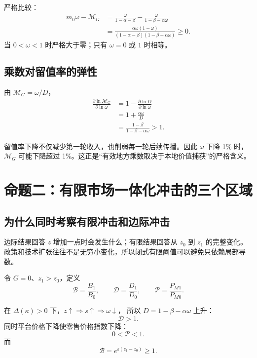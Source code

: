 \documentclass[UTF8,11pt,scheme=chinese,fontset=fandol]{ctexart}
\newcommand{\calB}{\mathcal B}
\newcommand{\calD}{\mathcal D}
\newcommand{\calP}{\mathcal P}
\newcommand{\MG}{\mathcal M_G}
\theoremstyle{definition}
\begin{document}
严格比较：
\begin{align}
m_0\omega-\MG
&=\frac{\omega}{1-\alpha-\beta}
-\frac{\omega}{1-\beta-\alpha\omega}\\
&=\frac{\alpha\omega(1-\omega)}
{(1-\alpha-\beta)(1-\beta-\alpha\omega)}\ge0.
\label{teach:eq:multiplier-gap}
\end{align}
当 \(0<\omega<1\) 时严格大于零；只有 \(\omega=0\) 或 \(1\) 时相等。

\subsection{乘数对留值率的弹性}

由 \(\MG=\omega/D\)，
\begin{align}
\frac{\partial\ln\MG}{\partial\ln\omega}
&=1-\frac{\partial\ln D}{\partial\ln\omega}\\
&=1+\frac{\alpha\omega}{D}\\
&=\frac{1-\beta}{1-\beta-\alpha\omega}>1.
\label{teach:eq:retention-elasticity}
\end{align}

留值率下降不仅减少第一轮收入，也削弱每一轮后续传播。因此 \(\omega\) 下降 1\% 时，
\(\MG\) 可能下降超过 1\%。这正是“有效地方乘数取决于本地价值捕获”的严格含义。

\section{命题二：有限市场一体化冲击的三个区域}

\subsection{为什么同时考察有限冲击和边际冲击}

边际结果回答 \(z\) 增加一点时会发生什么；有限结果回答从 \(z_0\) 到 \(z_1\) 的完整变化。
政策和技术扩张往往不是无穷小变化，所以闭式有限阈值可以避免只依赖局部导数。

令 \(G=0\)、\(z_1>z_0\)，定义
\begin{equation}
\calB=\frac{B_1}{B_0},\qquad
\calD=\frac{D_1}{D_0},\qquad
\calP=\frac{P_{M1}}{P_{M0}}.
\label{teach:eq:finite-objects}
\end{equation}

在 \(\Delta(\kappa)>0\) 下，\(z\uparrow\Rightarrow s\uparrow\Rightarrow\omega\downarrow\)，
所以 \(D=1-\beta-\alpha\omega\) 上升：
\[
\calD>1.
\]
同时平台价格下降使零售价格指数下降：
\[
0<\calP<1.
\]
而
\[
\calB=e^{\varepsilon(z_1-z_0)}\ge1.
\]
\end{document}
